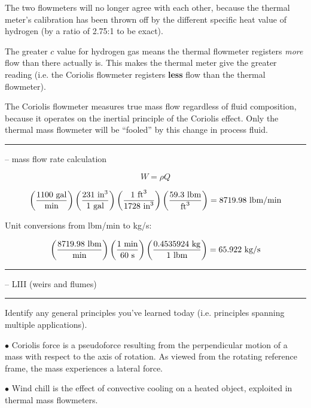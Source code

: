 The two flowmeters will no longer agree with each other, because the thermal meter's calibration has been thrown off by the different specific heat value of hydrogen (by a ratio of 2.75:1 to be exact).

\vskip 10pt

The greater $c$ value for hydrogen gas means the thermal flowmeter registers {\it more} flow than there actually is.  This makes the thermal meter give the greater reading (i.e. the Coriolis flowmeter registers {\bf less} flow than the thermal flowmeter).

\vskip 10pt

The Coriolis flowmeter measures true mass flow regardless of fluid composition, because it operates on the inertial principle of the Coriolis effect.  Only the thermal mass flowmeter will be ``fooled'' by this change in process fluid.


\filbreak \vskip 5pt \hrule \vskip 5pt  -- mass flow rate calculation \vskip 10pt

$$W = \rho Q$$

$$\left({1100 \hbox{ gal} \over \hbox{min}}\right) \left(231 \hbox{ in}^3 \over 1 \hbox{ gal}\right) \left(1 \hbox{ ft}^3 \over 1728 \hbox{ in}^3 \right) \left(59.3 \hbox{ lbm} \over \hbox{ft}^3 \right) = 8719.98 \hbox{ lbm/min}$$

\vskip 10pt

Unit conversions from lbm/min to kg/s:

$$\left(8719.98 \hbox{ lbm} \over \hbox{min}\right) \left(1 \hbox{ min} \over 60 \hbox{ s}\right) \left(0.4535924 \hbox{ kg} \over 1 \hbox{ lbm}\right) = 65.922 \hbox{ kg/s}$$


\filbreak \vskip 5pt \hrule \vskip 5pt  -- LIII (weirs and flumes) \vskip 10pt


\filbreak \vskip 5pt \hrule \vskip 5pt  \vskip 10pt

\noindent
Identify any general principles you've learned today (i.e. principles spanning multiple applications).
\item{$\bullet$} Coriolis force is a pseudoforce resulting from the perpendicular motion of a mass with respect to the axis of rotation.  As viewed from the rotating reference frame, the mass experiences a lateral force.
\item{$\bullet$} Wind chill is the effect of convective cooling on a heated object, exploited in thermal mass flowmeters.
\medskip

